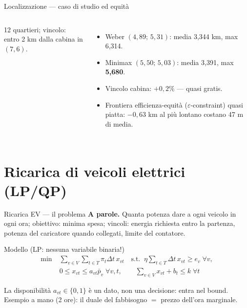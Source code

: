 \documentclass[11pt,aspectratio=169]{beamer}
\begin{document}
\begin{frame}{Localizzazione --- caso di studio ed equità}
\begin{columns}
\centering
\scalebox{0.62}{}
\small
12 quartieri; vincolo: entro 2 km dalla cabina in $(7, 6)$.
\begin{itemize}
  \item Weber $(4{,}89;\, 5{,}31)$: media 3,344 km, max 6,314.
  \item Minimax $(5{,}50;\, 5{,}03)$: media 3,391, max \textbf{5,680}.
  \item Vincolo cabina: $+0{,}2\%$ --- \alert{quasi gratis}.
  \item Frontiera efficienza-equità ($\varepsilon$-constraint) quasi piatta:
        $-0{,}63$ km al più lontano costano 47 m di media.
\end{itemize}
\end{columns}
\end{frame}

\section{Ricarica di veicoli elettrici (LP/QP)}

\begin{frame}{Ricarica EV --- il problema}
\textbf{A parole.} Quanta potenza dare a ogni veicolo in ogni ora; obiettivo: minima
spesa; vincoli: energia richiesta entro la partenza, potenza del caricatore quando
collegati, limite del contatore.
\begin{block}{Modello (LP: nessuna variabile binaria!)}
\vspace{-2ex}
\begin{align*}
\min\;& \textstyle\sum_{v \in V}\sum_{t \in T} \pi_t \Delta t\, x_{vt}
\quad\text{s.t.}\;\;
\eta \textstyle\sum_{t \in T} \Delta t\, x_{vt} \ge e_v \;\forall v,\\
& 0 \le x_{vt} \le a_{vt} \bar p_v \;\forall v, t,
\qquad \textstyle\sum_{v \in V} x_{vt} + b_t \le k \;\forall t
\end{align*}
\end{block}
La disponibilità $a_{vt} \in \{0,1\}$ è un \alert{dato}, non una decisione: entra
nel bound. Esempio a mano (2 ore): il duale del fabbisogno $=$ prezzo dell'ora
\alert{marginale}.
\end{frame}
\end{document}
